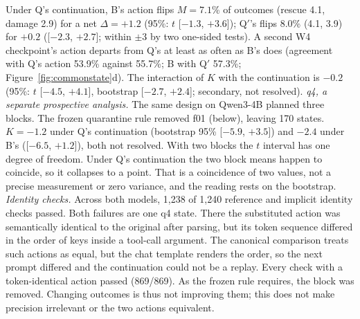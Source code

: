 Under Q's continuation, B's action flips $M=7.1$\% of outcomes (rescue 4.1, damage 2.9) for a net $\Delta=+1.2$\pp{} (95\%: $t$ [$-1.3$, $+3.6$]); Q$'$'s flips 8.0\% (4.1, 3.9) for $+0.2$\pp{} ([$-2.3$, $+2.7$]; within $\pm$3\pp{} by two one-sided tests). A second W4 checkpoint's action departs from Q's at least as often as B's does (agreement with Q's action 53.9\% against 55.7\%; B with Q$'$ 57.3\%; Figure~\ref{fig:commonstate}d). The interaction of $K$ with the continuation is $-0.2$\pp{} (95\%: $t$ [$-4.5$, $+4.1$], bootstrap [$-2.7$, $+2.4$]; secondary, not resolved). %
\emph{q4, a separate prospective analysis.} The same design on Qwen3-4B planned three blocks. The frozen quarantine rule removed f01 (below), leaving 170 states. $K=-1.2$\pp{} under Q's continuation (bootstrap 95\% [$-5.9$, $+3.5$]) and $-2.4$\pp{} under B's ([$-6.5$, $+1.2$]), both not resolved. With two blocks the $t$ interval has one degree of freedom. Under Q's continuation the two block means happen to coincide, so it collapses to a point. That is a coincidence of two values, not a precise measurement or zero variance, and the reading rests on the bootstrap. %
\emph{Identity checks.} Across both models, 1{,}238 of 1{,}240 reference and implicit identity checks passed. Both failures are one q4 state. There the substituted action was semantically identical to the original after parsing, but its token sequence differed in the order of keys inside a tool-call argument. The canonical comparison treats such actions as equal, but the chat template renders the order, so the next prompt differed and the continuation could not be a replay. Every check with a token-identical action passed (869/869). As the frozen rule requires, the block was removed. %
Changing outcomes is thus not improving them; this does not make precision irrelevant or the two actions equivalent.


